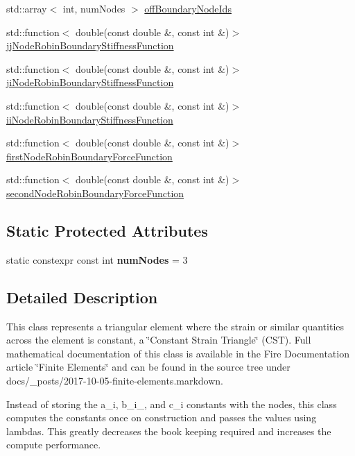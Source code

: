 \begin{DoxyCompactItemize}
std\+::array$<$ int, num\+Nodes $>$ \hyperlink{a00789_ac9e146872421c7dbd60e08f887b0cfc0}{off\+Boundary\+Node\+Ids}
\item 
std\+::function$<$ double(const double \&, const int \&)$>$ \hyperlink{a00789_a9fcfa817ef9b82d560608bcc531e41e5}{jj\+Node\+Robin\+Boundary\+Stiffness\+Function}
\item 
std\+::function$<$ double(const double \&, const int \&)$>$ \hyperlink{a00789_a6fb845d019aa63800d467329265b4a60}{ji\+Node\+Robin\+Boundary\+Stiffness\+Function}
\item 
std\+::function$<$ double(const double \&, const int \&)$>$ \hyperlink{a00789_a4251a56fbd95ceb58072c20cf905fdfb}{ii\+Node\+Robin\+Boundary\+Stiffness\+Function}
\item 
std\+::function$<$ double(const double \&, const int \&)$>$ \hyperlink{a00789_a906173f67d8e82edde9a33c0517e4d02}{first\+Node\+Robin\+Boundary\+Force\+Function}
\item 
std\+::function$<$ double(const double \&, const int \&)$>$ \hyperlink{a00789_a22fbf7cade7bab565c03e86ee8dc5697}{second\+Node\+Robin\+Boundary\+Force\+Function}
\end{DoxyCompactItemize}
\subsection*{Static Protected Attributes}
\begin{DoxyCompactItemize}
\item 
\mbox{\label{a00789_a3e23c9ef56fcb6641d5aa727370a827e}} 
static constexpr const int {\bfseries num\+Nodes} = 3
\end{DoxyCompactItemize}


\subsection{Detailed Description}
This class represents a triangular element where the strain or similar quantities across the element is constant, a \char`\"{}\+Constant Strain Triangle\char`\"{} (C\+ST). Full mathematical documentation of this class is available in the Fire Documentation article \char`\"{}\+Finite Elements\char`\"{} and can be found in the source tree under docs/\+\_\+posts/2017-\/10-\/05-\/finite-\/elements.\+markdown.

Instead of storing the a\+\_\+i, b\+\_\+i\+\_\+, and c\+\_\+i constants with the nodes, this class computes the constants once on construction and passes the values using lambdas. This greatly decreases the book keeping required and increases the compute performance.

